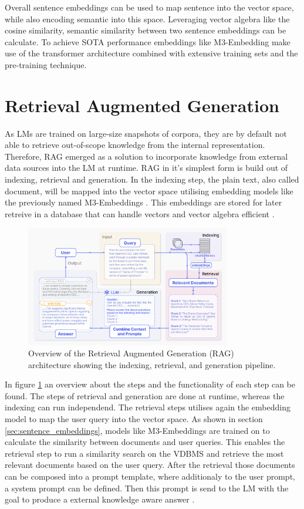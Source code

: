 \documentclass[a4paper,oneside,bibliography=totoc]{scrbook}
\begin{document}
Overall sentence embeddings can be used to map sentence into the vector space, while also encoding semantic into this space. Leveraging vector algebra like the cosine similarity, semantic similarity between two sentence embeddings can be calculate. To achieve SOTA performance embeddings like M3-Embedding make use of the transformer architecture combined with extensive training sets and the pre-training technique.

\section{Retrieval Augmented Generation}
\label{sec:retrieval_augmented_generation}

As \acp{LM} are trained on large-size snapshots of corpora, they are by default not able to retrieve out-of-scope knowledge from the internal representation. Therefore, \ac{RAG} emerged as a solution to incorporate knowledge from external data sources into the \ac{LM} at runtime. \ac{RAG} in it's simplest form is build out of indexing, retrieval and generation. In the indexing step, the plain text, also called document, will be mapped into the vector space utilising embedding models like the previously named M3-Embeddings \cite{Gao2024}. This embeddings are stored for later retreive in a database that can handle vectors and vector algebra efficient \cite{Gao2024,Pan2024}.

\begin{figure}[t]
  \centering
  \includegraphics[width=0.8\textwidth]{figures/RAG.png}
  \caption{Overview of the Retrieval Augmented Generation (RAG) architecture showing the indexing, retrieval, and generation pipeline. \cite{Gao2024}}
  \label{fig:rag}
\end{figure}

In figure \ref{fig:rag} an overview about the steps and the functionality of each step can be found. The steps of retrieval and generation are done at runtime, whereas the indexing can run independend. The retrieval steps utilises again the embedding model to map the user query into the vector space. As shown in section \ref{sec:sentence_embeddings}, models like M3-Embeddings are trained on to calculate the similarity between documents and user queries. This enables the retrieval step to run a similarity search on the \ac{VDBMS} and retrieve the most relevant documents based on the user query. After the retrieval those documents can be composed into a prompt template, where additionaly to the user prompt, a system prompt can be defined. Then this prompt is send to the \ac{LM} with the goal to produce a external knowledge aware answer \cite{Gao2024}.
\end{document}
